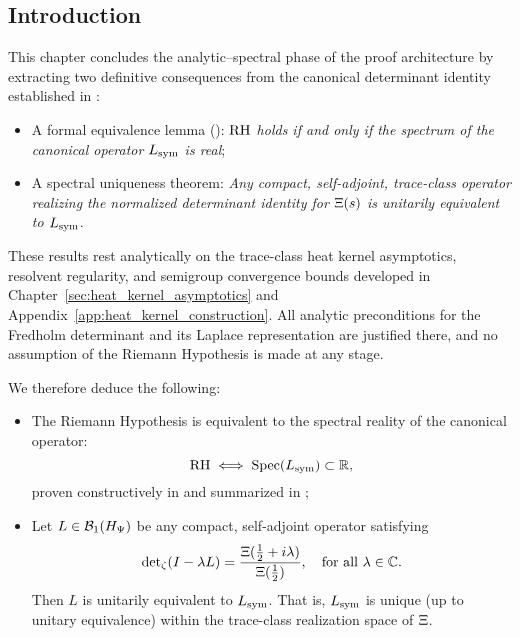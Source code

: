 \subsection*{Introduction}
\label{sec:intro_spectral_implications}

This chapter concludes the analytic–spectral phase of the proof architecture by extracting two definitive consequences from the canonical determinant identity established in :

\begin{itemize}
  \item A formal equivalence lemma (): \emph{\(\mathrm{RH}\) holds if and only if the spectrum of the canonical operator \( L_{\mathrm{sym}} \) is real};

  \item A spectral uniqueness theorem: \emph{Any compact, self-adjoint, trace-class operator realizing the normalized determinant identity for \( \Xi(s) \) is unitarily equivalent to \( L_{\mathrm{sym}} \)}.
\end{itemize}

\medskip

These results rest analytically on the trace-class heat kernel asymptotics, resolvent regularity, and semigroup convergence bounds developed in Chapter~\ref{sec:heat_kernel_asymptotics} and Appendix~\ref{app:heat_kernel_construction}. All analytic preconditions for the Fredholm determinant and its Laplace representation are justified there, and no assumption of the Riemann Hypothesis is made at any stage.

\medskip

We therefore deduce the following:

\begin{itemize}
  \item The Riemann Hypothesis is equivalent to the spectral reality of the canonical operator:
  \[
    \mathrm{RH} \iff \operatorname{Spec}(L_{\mathrm{sym}}) \subset \mathbb{R},
  \]
  proven constructively in  and summarized in ;

  \item Let \( L \in \mathcal{B}_1(H_{\Psi}) \) be any compact, self-adjoint operator satisfying
  \[
    \det\nolimits_\zeta(I - \lambda L) = \frac{\Xi(\tfrac{1}{2} + i\lambda)}{\Xi(\tfrac{1}{2})}, \quad \text{for all } \lambda \in \mathbb{C}.
  \]
  Then \( L \) is unitarily equivalent to \( L_{\mathrm{sym}} \). That is, \( L_{\mathrm{sym}} \) is unique (up to unitary equivalence) within the trace-class realization space of \( \Xi \).
\end{itemize}

